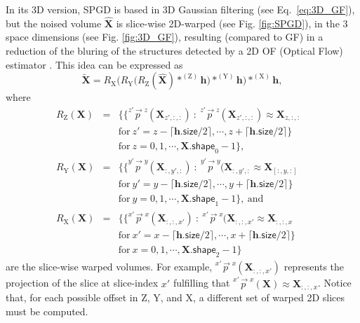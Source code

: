 \documentclass{article}
\begin{document}
In its 3D version, SPGD is based in 3D Gaussian filtering (see
Eq.~\ref{eq:3D_GF}), but the noised volume $\hat{\mathbf{X}}$ is
slice-wise 2D-warped (see Fig. \ref{fig:SPGD}), in the 3 space
dimensions (see Fig. \ref{fig:3D_GF}), resulting (compared to GF) in a
reduction of the bluring of the structures detected by a 2D OF
(Optical Flow) estimator \cite{gonzalez2023structure}. This idea can
be expressed as
\begin{equation}
  \tilde{\mathbf{X}}  = R_\text{X}\Big(R_\text{Y}\big(R_\text{Z}(\hat{\mathbf{X}})*^{(\text{Z})}{\mathbf h}\big)*^{(\text{Y})}{\mathbf h}\Big)*^{(\text{X})}{\mathbf h},
    \label{eq:SDPG}
\end{equation}
where
\begin{equation*}
  \begin{array}{rclll}
    R_\text{Z}(\mathbf{X}) & = & \big\{ \{ \overset{z'\rightarrow z}p(\mathbf{X}_{z',:,:})~:~\overset{z'\rightarrow z}p(\mathbf{X}_{z',:,:})\approx\mathbf{X}_{z,:,:} & \\ & & \text{for}~z'=z-\lceil\mathbf{h}.\mathsf{size}/2\rceil,\cdots,z+\lceil\mathbf{h}.\mathsf{size}/2\rceil\} & \\ & & \text{for}~z=0,1,\cdots,\mathbf{X}.\mathsf{shape}_0-1\big\}, \\
    R_\text{Y}(\mathbf{X}) & = & \big\{ \{ \overset{y'\rightarrow y}p(\mathbf{X}_{:,y',:})~:~\overset{y'\rightarrow y}p(\mathbf{X}_{:,y',:}\approx\mathbf{X}_{[:,y,:]} & \\ & & \text{for}~y'=y-\lceil\mathbf{h}.\mathsf{size}/2\rceil,\cdots,y+\lceil\mathbf{h}.\mathsf{size}/2\rceil\} & \\ & & \text{for}~y=0,1,\cdots,\mathbf{X}.\mathsf{shape}_1-1\big\},~\text{and} \\
    R_\text{X}(\mathbf{X}) & = & \big\{ \{ \overset{x'\rightarrow x}p(\mathbf{X}_{:,:,x'})~:~\overset{x'\rightarrow x}p(\mathbf{X}_{:,:,x'}\approx\mathbf{X}_{:,:,x} & \\ & & \text{for}~x'=x-\lceil\mathbf{h}.\mathsf{size}/2\rceil,\cdots,x+\lceil\mathbf{h}.\mathsf{size}/2\rceil\} & \\ & & \text{for}~x=0,1,\cdots,\mathbf{X}.\mathsf{shape}_2-1\big\}
    \end{array}
\end{equation*}
are the slice-wise warped volumes. For example,
$\overset{x'\rightarrow x}p(\mathbf{X}_{:,:,x'})$ represents the
projection of the slice at slice-index $x'$ fulfilling that
$\overset{x'\rightarrow
  x}p({\mathbf{X}})\approx{\mathbf{X}}_{:,:,x}$. Notice that, for
each possible offset in $\text{Z}$, $\text{Y}$, and $\text{X}$, a
different set of warped 2D slices must be computed.
\end{document}
